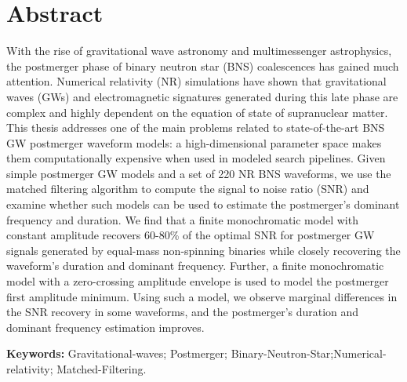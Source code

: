\chapter*{Abstract}

With the rise of gravitational wave astronomy and multimessenger astrophysics, the postmerger phase of binary neutron star (BNS) coalescences has gained much attention. Numerical relativity (NR) simulations have shown that gravitational waves (GWs) and electromagnetic signatures generated during this late phase are complex and highly dependent on the equation of state of supranuclear matter. This thesis addresses one of the main problems related to state-of-the-art BNS GW postmerger waveform models: a high-dimensional parameter space makes them computationally expensive when used in modeled search pipelines. Given simple postmerger GW models and a set of 220 NR BNS waveforms, we use the matched filtering algorithm to compute the signal to noise ratio (SNR) and examine whether such models can be used to estimate the postmerger's dominant frequency and duration. We find that a finite monochromatic model with constant amplitude recovers 60-80\% of the optimal SNR for postmerger GW signals generated by equal-mass non-spinning binaries while closely recovering the waveform's duration and dominant frequency. Further, a finite monochromatic model with a zero-crossing amplitude envelope is used to model the postmerger first amplitude minimum. Using such a model, we observe marginal differences in the SNR recovery in some waveforms,  and the postmerger's duration and dominant frequency estimation improves.








\vspace{1cm}
\textbf{Keywords:} Gravitational-waves; Postmerger; Binary-Neutron-Star;Numerical-relativity; Matched-Filtering.
